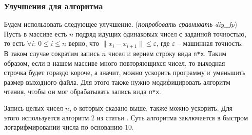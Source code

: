 \subsubsection{Улучшения для алгоритма}
Будем использовать следующее улучшение. (\textit{попробовать сравнивать diy\_fp})
Пусть в массиве есть $n$ подряд идущих одинаковых чисел с заданной точностью, то есть $\forall i: \, 0 \leqslant i \leqslant n$ верно, что $\|x_i - x_{i+1}\| \leqslant \varepsilon$, где $\varepsilon$ -- машинная точность.
В таком случае сократим запись $n$ чисел и вернем строку вида \texttt{n*x}.
Таким образом, если в нашем массиве много повторяющихся чисел, то выходная строчка будет гораздо короче, а значит, можно ускорить программу и уменьшить размер выходного файла.
Для этого также нужно модифицировать алгоритм чтения, чтобы он мог обрабатывать запись вида \texttt{n*x}.

Запись целых чисел $n$, о которых сказано выше, также можно ускорить.
Для этого используется алгоритм 2 из статьи \cite{2}.
Суть алгоритма заключается в быстром логарифмировании числа по основанию 10.

